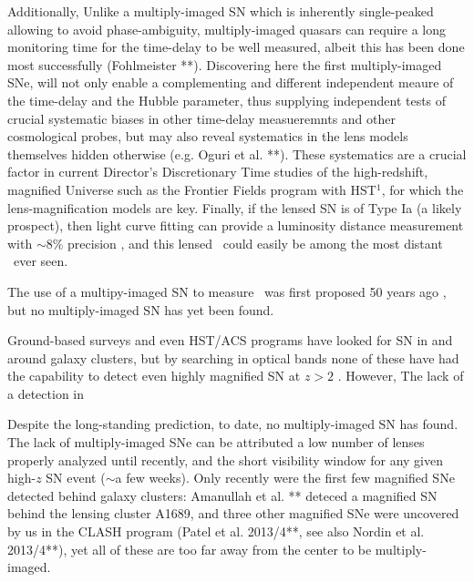 Additionally,  Unlike
a multiply-imaged SN which is inherently single-peaked allowing to
avoid phase-ambiguity, multiply-imaged quasars can require a long
monitoring time for the time-delay to be well measured, albeit this
has been done most successfully (Fohlmeister **). Discovering here the
first multiply-imaged SNe, will not only enable a complementing and
different independent meaure of the time-delay and the Hubble
parameter, thus supplying independent tests of crucial systematic
biases in other time-delay measueremnts and other cosmological probes,
but may also reveal systematics in the lens models themselves hidden
otherwise (e.g. Oguri et al. **). These systematics are a crucial
factor in current Director's Discretionary Time studies of the
high-redshift, magnified Universe such as the Frontier Fields program
with HST${^1}$, for which the lens-magnification
models are key. Finally, if the lensed SN is of Type Ia (a likely
prospect), then light curve fitting can provide a luminosity distance
measurement with $\sim$8\% precision \citep{Phillips:1993}, and this
lensed \SNIa\ could easily be among the most distant \SNIa\ ever seen.


The use of a multipy-imaged SN to measure \Ho\ was first proposed 50
years ago \citep{Refsdal:1964}, but no multiply-imaged SN has yet been
found.

 Ground-based surveys and even
HST/ACS programs have looked for SN in and around galaxy clusters,
but by searching in optical bands none of these have had 
the capability to detect even highly magnified SN at
$z>2$
 \citep[e.g.][]{Sharon:2007,Dawson:2009,Sharon:2010,Sand:2011}. However,
  The lack of a detection in 

{ Despite the long-standing prediction, to date, no multiply-imaged SN has found}. The lack of multiply-imaged SNe can be attributed a low number of lenses properly analyzed until recently, and the short visibility window
for any given high-$z$ SN event ($\sim$a few weeks). Only recently were the first few magnified SNe detected behind galaxy clusters: Amanullah et al. ** deteced a magnified SN behind the lensing cluster A1689, and three other magnified SNe were uncovered by us in the CLASH program (Patel et al. 2013/4**, see also Nordin et al. 2013/4**), yet all of these are too far away from the center to be multiply-imaged. 




